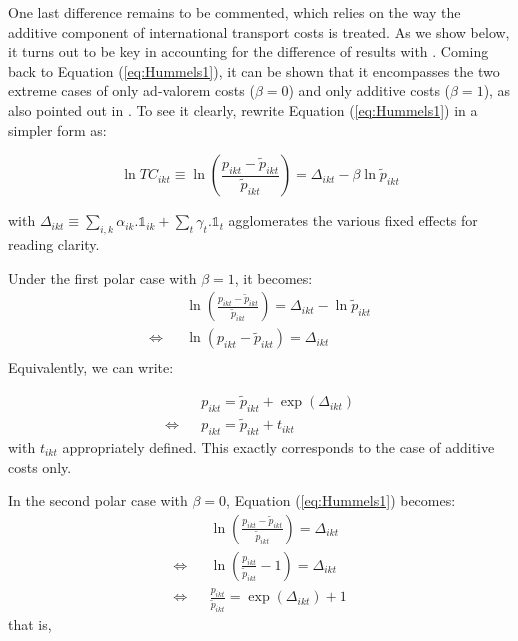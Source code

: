 \documentclass[a4paper,11pt]{article}
\begin{document}


One last difference remains to be commented, which relies on the way the additive component of international transport costs is treated. As we show below, it turns out to be key in accounting for the difference of results with \cite{hummels2007}. Coming back to Equation (\ref{eq:Hummels1}), it can be shown that it encompasses the two extreme cases of only ad-valorem costs ($\beta = 0$) and only additive costs ($\beta=1$), as also pointed out in \cite{hummels_skiba}. To see it clearly, rewrite Equation (\ref{eq:Hummels1}) in a simpler form as:

$$\ln TC_{ikt} \equiv \ln \left(\frac{p_{ikt}- \widetilde{p}_{ikt}}{\widetilde{p}_{ikt}} \right) = \Delta_{ikt}- \beta \ln \widetilde{p}_{ikt} $$

\noindent with $\Delta_{ikt} \equiv \sum_{i,k}\alpha_{ik}.\mathbb{1}_{ik}+ \sum_{t}\gamma_{t}.\mathbb{1}_{t}$ agglomerates the various fixed effects for reading clarity.

Under the first polar case with $\beta = 1$, it becomes:
\begin{eqnarray*}
&&\ln \left(\frac{p_{ikt}- \widetilde{p}_{ikt}}{\widetilde{p}_{ikt}} \right) = \Delta_{ikt}- \ln \widetilde{p}_{ikt} \\
\Leftrightarrow && \ln (p_{ikt}- \widetilde{p}_{ikt}) = \Delta_{ikt} \\
\end{eqnarray*}
\noindent Equivalently, we can write:

\begin{eqnarray*}
&&p_{ikt} = \widetilde{p}_{ikt} + \exp(\Delta_{ikt})\\
\Leftrightarrow && p_{ikt} = \widetilde{p}_{ikt} + t_{ikt}
\end{eqnarray*}
\noindent with $t_{ikt}$ appropriately defined. This exactly corresponds to the case of additive costs only.

In the second polar case with $\beta = 0$, Equation (\ref{eq:Hummels1}) becomes:
\begin{eqnarray*}
&&\ln \left(\frac{p_{ikt}- \widetilde{p}_{ikt}}{\widetilde{p}_{ikt}} \right) = \Delta_{ikt} \\
\Leftrightarrow && \ln \left(\frac{p_{ikt}}{\widetilde{p}_{ikt}}-1\right) = \Delta_{ikt}\\
\Leftrightarrow && \frac{p_{ikt}}{\widetilde{p}_{ikt}}  = \exp (\Delta_{ikt})+1
\end{eqnarray*}
\noindent that is,
\end{document}
